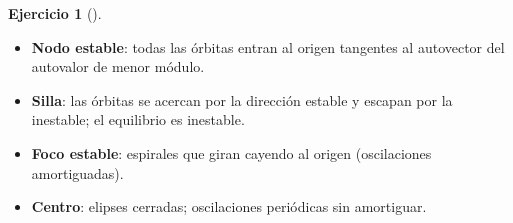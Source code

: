 \documentclass[
  spanish,
  a4paper,
]{scrreport}
\providecommand{\tightlist}{%
  \setlength{\itemsep}{0pt}\setlength{\parskip}{0pt}}
\theoremstyle{definition}
\newtheorem{exercise}{Ejercicio}[chapter]
\theoremstyle{remark}
\begin{document}
\begin{exercise}[]
\begin{tcolorbox}
\begin{itemize}
\tightlist
\item
  \textbf{Nodo estable}: todas las órbitas entran al origen tangentes al
  autovector del autovalor de menor módulo.
\item
  \textbf{Silla}: las órbitas se acercan por la dirección estable y
  escapan por la inestable; el equilibrio es inestable.
\item
  \textbf{Foco estable}: espirales que giran cayendo al origen
  (oscilaciones amortiguadas).
\item
  \textbf{Centro}: elipses cerradas; oscilaciones periódicas sin
  amortiguar.
\end{itemize}

\end{tcolorbox}

\end{exercise}
\end{document}
